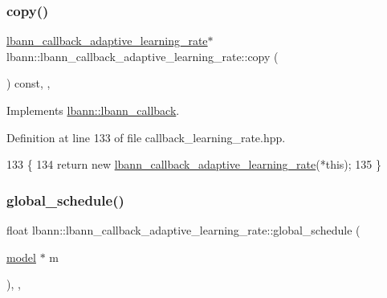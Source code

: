\subsubsection{\texorpdfstring{copy()}{copy()}}
{\footnotesize\ttfamily \hyperlink{classlbann_1_1lbann__callback__adaptive__learning__rate}{lbann\+\_\+callback\+\_\+adaptive\+\_\+learning\+\_\+rate}$\ast$ lbann\+::lbann\+\_\+callback\+\_\+adaptive\+\_\+learning\+\_\+rate\+::copy (\begin{DoxyParamCaption}{ }\end{DoxyParamCaption}) const\hspace{0.3cm}{\ttfamily [inline]}, {\ttfamily [override]}, {\ttfamily [virtual]}}



Implements \hyperlink{classlbann_1_1lbann__callback_a9f545d1269a8c7af335625d049691f26}{lbann\+::lbann\+\_\+callback}.



Definition at line 133 of file callback\+\_\+learning\+\_\+rate.\+hpp.


\begin{DoxyCode}
133                                                                \{
134     \textcolor{keywordflow}{return} \textcolor{keyword}{new} \hyperlink{classlbann_1_1lbann__callback__adaptive__learning__rate_a2095e4c430b3c4f206e85c963e1ec2aa}{lbann\_callback\_adaptive\_learning\_rate}(*\textcolor{keyword}{this});
135   \}
\end{DoxyCode}
\mbox{\label{classlbann_1_1lbann__callback__adaptive__learning__rate_a6c64fae03736b8acba5c839f59d2ac6f}} 
\subsubsection{\texorpdfstring{global\+\_\+schedule()}{global\_schedule()}}
{\footnotesize\ttfamily float lbann\+::lbann\+\_\+callback\+\_\+adaptive\+\_\+learning\+\_\+rate\+::global\+\_\+schedule (\begin{DoxyParamCaption}\item[{\hyperlink{classlbann_1_1model}{model} $\ast$}]{m }\end{DoxyParamCaption})\hspace{0.3cm}{\ttfamily [override]}, {\ttfamily [protected]}, {\ttfamily [virtual]}}

